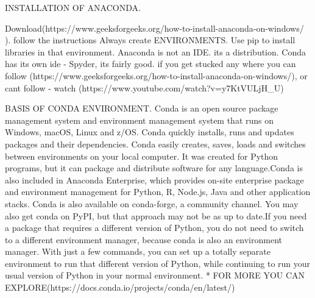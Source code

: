 INSTALLATION OF ANACONDA.

Download(https://www.geeksforgeeks.org/how-to-install-anaconda-on-windows/ ). follow the instructions
Always create ENVIRONMENTS. Use pip to install libraries in that environment.
Anaconda is not an IDE. its a distribution. Conda has its own ide - Spyder, its fairly good.
if you get stucked any where you can follow (https://www.geeksforgeeks.org/how-to-install-anaconda-on-windows/), or cant follow - watch (https://www.youtube.com/watch?v=y7KtVULjH_U)

BASIS OF CONDA ENVIRONMENT.
Conda is an open source package management system and environment management system that runs on Windows, macOS, Linux and z/OS. Conda quickly installs, runs and updates packages and their dependencies. Conda easily creates, saves, loads and switches between environments on your local computer. It was created for Python programs, but it can package and distribute software for any language.Conda is also included in Anaconda Enterprise, which provides on-site enterprise package and environment management for Python, R, Node.js, Java and other application stacks. Conda is also available on conda-forge, a community channel. You may also get conda on PyPI, but that approach may not be as up to date.If you need a package that requires a different version of Python, you do not need to switch to a different environment manager, because conda is also an environment manager. With just a few commands, you can set up a totally separate environment to run that different version of Python, while continuing to run your usual version of Python in your normal environment.
 * FOR MORE YOU CAN EXPLORE(https://docs.conda.io/projects/conda/en/latest/) 
